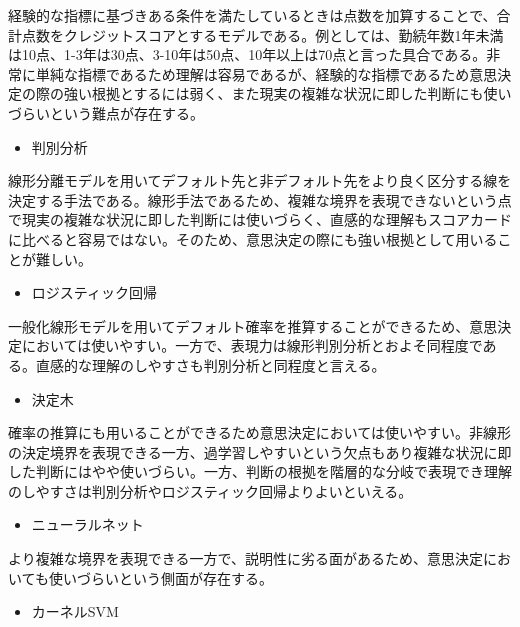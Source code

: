 \documentclass[11pt]{jsarticle}
\providecommand{\tightlist}{%
      \setlength{\itemsep}{0pt}\setlength{\parskip}{0pt}}
\begin{document}
経験的な指標に基づきある条件を満たしているときは点数を加算することで、合計点数をクレジットスコアとするモデルである。例としては、勤続年数1年未満は10点、1-3年は30点、3-10年は50点、10年以上は70点と言った具合である\cite{scorecard}。非常に単純な指標であるため理解は容易であるが、経験的な指標であるため意思決定の際の強い根拠とするには弱く、また現実の複雑な状況に即した判断にも使いづらいという難点が存在する。

\begin{itemize}
\tightlist
\item
  判別分析
\end{itemize}

線形分離モデルを用いてデフォルト先と非デフォルト先をより良く区分する線を決定する手法である。線形手法であるため、複雑な境界を表現できないという点で現実の複雑な状況に即した判断には使いづらく、直感的な理解もスコアカードに比べると容易ではない。そのため、意思決定の際にも強い根拠として用いることが難しい。

\begin{itemize}
\tightlist
\item
  ロジスティック回帰
\end{itemize}

一般化線形モデルを用いてデフォルト確率を推算することができるため、意思決定においては使いやすい。一方で、表現力は線形判別分析とおよそ同程度である。直感的な理解のしやすさも判別分析と同程度と言える。

\begin{itemize}
\tightlist
\item
  決定木
\end{itemize}

確率の推算にも用いることができるため意思決定においては使いやすい。非線形の決定境界を表現できる一方、過学習しやすいという欠点もあり複雑な状況に即した判断にはやや使いづらい。一方、判断の根拠を階層的な分岐で表現でき理解のしやすさは判別分析やロジスティック回帰よりよいといえる。

\begin{itemize}
\tightlist
\item
  ニューラルネット
\end{itemize}

より複雑な境界を表現できる一方で、説明性に劣る面があるため、意思決定においても使いづらいという側面が存在する。

\begin{itemize}
\tightlist
\item
  カーネルSVM
\end{itemize}
\end{document}
